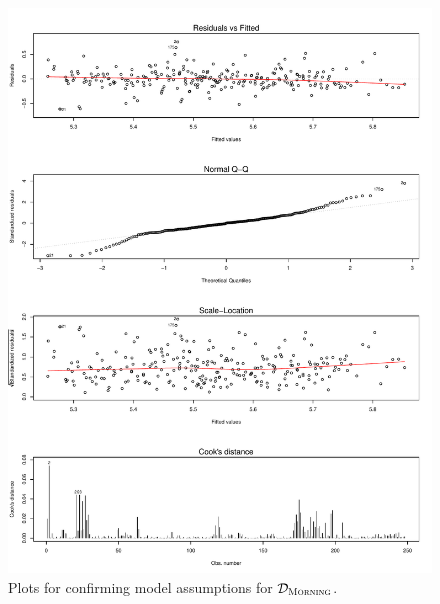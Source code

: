 \begin{figure}[!ht]
    \center
    \includegraphics[width=\textwidth]{../plots/model_mp_assumptions}    
    \caption{Plots for confirming model assumptions for $\mathcal{D}_{\textsc{Morning}}$.}    
    \label{fig:model_mp_assumptions}
\end{figure}


